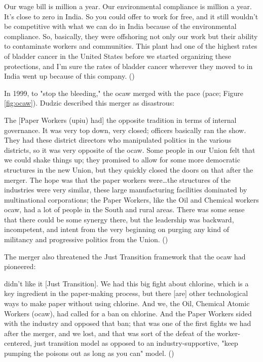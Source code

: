 \documentclass[12pt]{article}
\renewenvironment{quote}
  {\list{}{\leftmargin=\parindent\rightmargin=0pt}%
   \item\relax}
  {\endlist}
\begin{document}
\begin{quote}
Our wage bill is  million a year. Our environmental compliance is  million a year. It's close to zero in India. So you could offer to work for free, and it still wouldn't be competitive with what we can do in India because of the environmental compliance. So, basically, they were offshoring not only our work but their ability to contaminate workers and communities. This plant had one of the highest rates of bladder cancer in the United States before we started organizing these protections, and I'm sure the rates of bladder cancer wherever they moved to in India went up because of this company. (\citeyear{dudzicInterview2024})
\end{quote}

In 1999, to "stop the bleeding," the \acrshort{ocaw} merged with the \acrlong{pace} (\acrshort{pace}; Figure \ref{fig:ocaw}). Dudzic described this merger as disastrous:

\begin{quote}
The [Paper Workers (\acrshort{upiu}) had] the opposite tradition in terms of internal governance. It was very top down, very closed; officers basically ran the show. They had these district directors who manipulated politics in the various districts, so it was very opposite of the \acrshort{ocaw}. Some people in our Union felt that we could shake things up; they promised to allow for some more democratic structures in the new Union, but they quickly closed the doors on that after the merger. The hope was that the paper workers were\ldots{}the structures of the industries were very similar, these large manufacturing facilities dominated by multinational corporations; the Paper Workers, like the Oil and Chemical workers \acrshort{ocaw}, had a lot of people in the South and rural areas. There was some sense that there could be some synergy there, but the leadership was backward, incompetent, and intent from the very beginning on purging any kind of militancy and progressive politics from the Union. (\citeyear{dudzicInterview2024})
\end{quote}

\noindent{}The merger also threatened the Just Transition framework that the \acrshort{ocaw} had pioneered:

\begin{quote}
[The \acrshort{upiu}] didn't like it [Just Transition]. We had this big fight about chlorine, which is a key ingredient in the paper-making process, but there [are] other technological ways to make paper without using chlorine. And we, the Oil, Chemical Atomic Workers (\acrshort{ocaw}), had called for a ban on chlorine. And the Paper Workers sided with the industry and opposed that ban; that was one of the first fights we had after the merger, and we lost, and that was sort of the defeat of the worker-centered, just transition model as opposed to an industry-supportive, "keep pumping the poisons out as long as you can" model. (\citeyear{dudzicInterview2024})
\end{quote}
\end{document}
